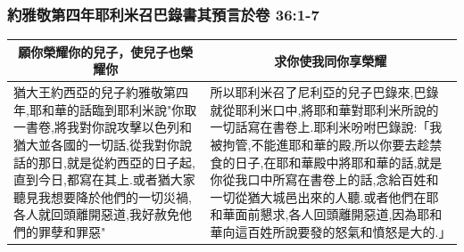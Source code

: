 \subsubsection{約雅敬第四年耶利米召巴錄書其預言於卷 36:1-7}
\begin{table}[H]
\centering
\begin{tabular}{p{7.5cm}|p{10.2cm}}\hline\hline
\multicolumn{1}{c|}{願你榮耀你的兒子，使兒子也榮耀你}&\multicolumn{1}{c}{求你使我同你享榮耀}\\\hline
猶大王約西亞的兒子約雅敬第四年,耶和華的話臨到耶利米說"你取一書卷,將我對你說攻擊以色列和猶大並各國的一切話,從我對你說話的那日,就是從約西亞的日子起,直到今日,都寫在其上.或者猶大家聽見我想要降於他們的一切災禍,各人就回頭離開惡道,我好赦免他們的罪孽和罪惡"
&所以耶利米召了尼利亞的兒子巴錄來,巴錄就從耶利米口中,將耶和華對耶利米所說的一切話寫在書卷上.耶利米吩咐巴錄說:「我被拘管,不能進耶和華的殿,所以你要去趁禁食的日子,在耶和華殿中將耶和華的話,就是你從我口中所寫在書卷上的話,念給百姓和一切從猶大城邑出來的人聽.或者他們在耶和華面前懇求,各人回頭離開惡道,因為耶和華向這百姓所說要發的怒氣和憤怒是大的.」 \\\hline
\end{tabular}
\end{table}




